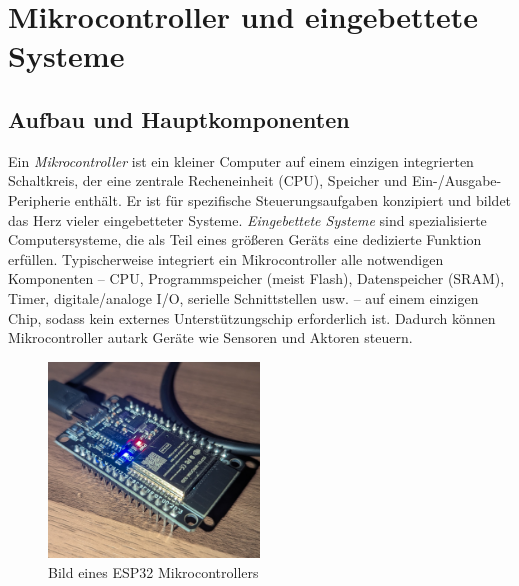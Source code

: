 \section{Mikrocontroller und eingebettete Systeme}

\subsection*{Aufbau und Hauptkomponenten}
Ein \emph{Mikrocontroller} ist ein kleiner Computer auf einem einzigen integrierten Schaltkreis, der eine zentrale Recheneinheit (CPU), Speicher und Ein-/Ausgabe-Peripherie enthält. Er ist für spezifische Steuerungsaufgaben konzipiert und bildet das Herz vieler eingebetteter Systeme. \emph{Eingebettete Systeme} sind spezialisierte Computersysteme, die als Teil eines größeren Geräts eine dedizierte Funktion erfüllen. Typischerweise integriert ein Mikrocontroller alle notwendigen Komponenten – CPU, Programmspeicher (meist Flash), Datenspeicher (SRAM), Timer, digitale/analoge I/O, serielle Schnittstellen usw. – auf einem einzigen Chip, sodass kein externes Unterstützungschip erforderlich ist. Dadurch können Mikrocontroller autark Geräte wie Sensoren und Aktoren steuern. \autocite{Microcontroller_vs_Microprocessor}

\begin{figure}[H]
	\centering
	\vspace{1em}
	\includegraphics[width=0.5\textwidth, height=0.5\textheight, keepaspectratio]{./img/PXL_20250414_235020869.jpg}
	\caption{Bild eines ESP32 Mikrocontrollers}
	\label{fig:ESP32}
\end{figure}
\newpage

